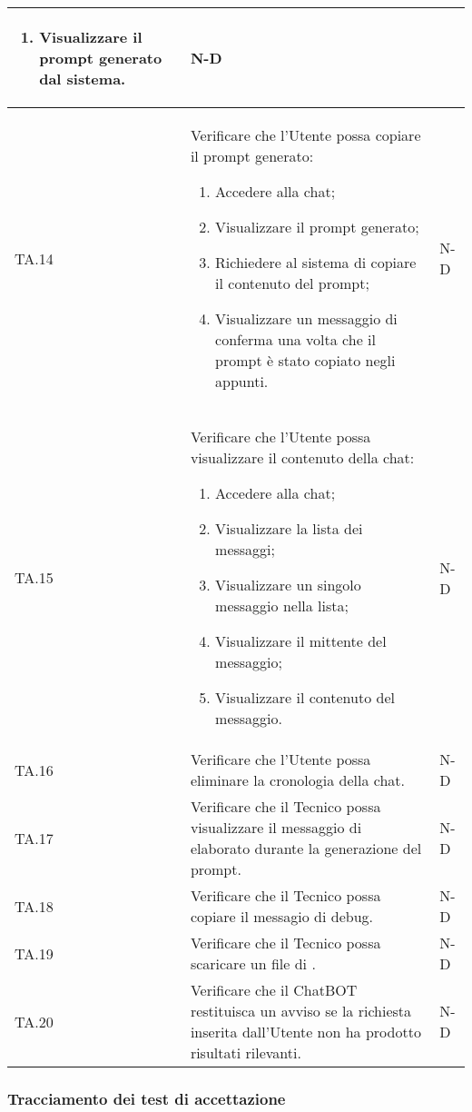 \begin{adjustwidth}{-0.5cm}{-0.5cm}
\begin{longtable}{|P{1.5cm}|>{\raggedright}P{9.5cm}|>{\arraybackslash}P{1.5cm}|}
\begin{enumerate}
			\item Visualizzare il prompt generato dal sistema.
		\end{enumerate}
		& N-D \\
		\hline TA.14 & Verificare che l'Utente possa copiare il prompt generato:
		\begin{enumerate}
			\item Accedere alla chat;
			\item Visualizzare il prompt generato;
			\item Richiedere al sistema di copiare il contenuto del prompt;
			\item Visualizzare un messaggio di conferma una volta che il prompt è stato copiato negli appunti.				
		\end{enumerate}
		& N-D \\
		\hline TA.15 & Verificare che l'Utente possa visualizzare il contenuto della chat: 
		\begin{enumerate}
			\item Accedere alla chat;
			\item Visualizzare la lista dei messaggi;
			\item Visualizzare un singolo messaggio nella lista;
			\item Visualizzare il mittente del messaggio;
			\item Visualizzare il contenuto del messaggio.						
		\end{enumerate}
		& N-D \\
		\hline TA.16 & Verificare che l'Utente possa eliminare la cronologia della chat. & N-D \\
		\hline TA.17 & Verificare che il Tecnico possa visualizzare il messaggio di  elaborato durante la generazione del prompt. & N-D \\
		\hline TA.18 & Verificare che il Tecnico possa copiare il messagio di debug. & N-D \\
		\hline TA.19 & Verificare che il Tecnico possa scaricare un file di . & N-D \\
		\hline TA.20 & Verificare che il ChatBOT restituisca un avviso se la richiesta inserita dall'Utente non ha prodotto risultati rilevanti. & N-D \\
	\end{longtable}
\end{adjustwidth}
\egroup

\clearpage
\subsubsection{Tracciamento dei test di accettazione}

